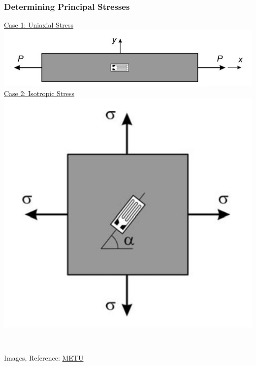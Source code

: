 \documentclass[fleqn]{beamer} %
\newcommand{\sectionIIIsubsectionIIItitle}{Determining Principal Stresses}
\begin{document}
			\begin{frame}[containsverbatim]
				\frametitle{\sectionIIIsubsectionIIItitle}\scriptsize

				\begin{multicols}{2}
					\underline{Case 1: Uniaxial Stress} 
					\includegraphics[scale=.18]{images/metu_fig1.png} \vspc
					\underline{Case 2: Isotropic Stress} 
					\includegraphics[scale=.18]{images/metu_fig2.png}

					 \vspace{25mm}\\

					\vspc
					\vspc

					\vspace{10mm}
					{\tiny Images, Reference: \href{http://courses.me.metu.edu.tr/courses/me410/exp5/ME410_exp5_theory.pdf}{METU}}
				\end{multicols}

			\end{frame}
\end{document}
